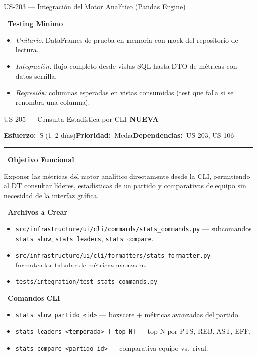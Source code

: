 \documentclass[11pt,a4paper]{article}
\newcommand{\fpath}[1]{\texttt{\small #1}}
\newcommand{\usfield}[2][\;]{%
  \par\vspace{5pt}%
  {\small\textbf{\textcolor{primary}{#2}}}\par\vspace{2pt}%
}
\newcommand{\usmeta}[3]{%
  \vspace{2pt}%
  {\small\textcolor{secondary}{%
    \textbf{Esfuerzo:}~#1\quad\textbf{Prioridad:}~#2\quad\textbf{Dependencias:}~#3%
  }}%
  \par\vspace{4pt}%
  \textcolor{bordergray}{\rule{\linewidth}{0.4pt}}\par\vspace{4pt}%
}
\newcommand{\tagnew}{\,\colorbox{tagnew}{\tiny\bfseries NUEVA}\,}
\begin{document}
\begin{uscard}{US-203 — Integración del Motor Analítico (Pandas Engine)}
\usfield{\faFlask\ Testing Mínimo}
\begin{itemize}[nosep, leftmargin=1.6em]
  \item \textit{Unitario:} DataFrames de prueba en memoria con mock del repositorio de lectura.
  \item \textit{Integración:} flujo completo desde vistas SQL hasta DTO de métricas con datos semilla.
  \item \textit{Regresión:} columnas esperadas en vistas consumidas (test que falla si se renombra una columna).
\end{itemize}

\end{uscard}

\begin{uscard}{US-205 — Consulta Estadística por CLI \tagnew}

\usmeta{S (1–2 días)}{Media}{US-203, US-106}

\usfield{\faAlignLeft\ Objetivo Funcional}
Exponer las métricas del motor analítico directamente desde la CLI, permitiendo al DT consultar líderes, estadísticas de un partido y comparativas de equipo sin necesidad de la interfaz gráfica.

\usfield{\faFolderOpen\ Archivos a Crear}
\begin{itemize}[nosep, leftmargin=1.6em]
  \item \fpath{src/infrastructure/ui/cli/commands/stats\_commands.py} — subcomandos \fpath{stats show}, \fpath{stats leaders}, \fpath{stats compare}.
  \item \fpath{src/infrastructure/ui/cli/formatters/stats\_formatter.py} — formateador tabular de métricas avanzadas.
  \item \fpath{tests/integration/test\_stats\_commands.py}
\end{itemize}

\usfield{\faTerminal\ Comandos CLI}
\begin{itemize}[nosep, leftmargin=1.6em]
  \item \fpath{stats show partido <id>} — boxscore + métricas avanzadas del partido.
  \item \fpath{stats leaders <temporada> [--top N]} — top-N por PTS, REB, AST, EFF.
  \item \fpath{stats compare <partido\_id>} — comparativa equipo vs.\ rival.
\end{itemize}


\end{uscard}
\end{document}
